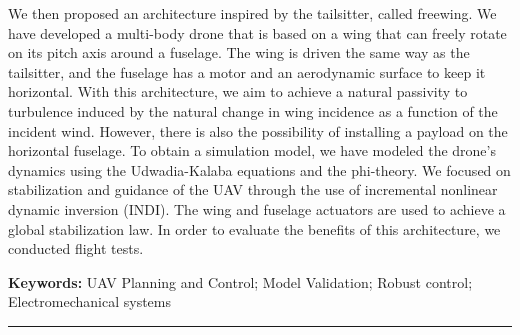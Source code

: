 \begin{vcenterpage}
We then proposed an architecture inspired by the tailsitter, called freewing. We have developed a multi-body drone that is based on a wing that can freely rotate on its pitch axis around a fuselage. The wing is driven the same way as the tailsitter, and the fuselage has a motor and an aerodynamic surface to keep it horizontal. With this architecture, we aim to achieve a natural passivity to turbulence induced by the natural change in wing incidence as a function of the incident wind. However, there is also the possibility of installing a payload on the horizontal fuselage. To obtain a simulation model, we have modeled the drone's dynamics using the Udwadia-Kalaba equations and the phi-theory. We focused on stabilization and guidance of the UAV through the use of incremental nonlinear dynamic inversion (INDI). The wing and fuselage actuators are used to achieve a global stabilization law. In order to evaluate the benefits of this architecture, we conducted flight tests.

{\large\textbf{Keywords:}}
UAV Planning and Control; Model Validation; Robust control; Electromechanical systems

\noindent\rule[2pt]{\textwidth}{0.5pt}
\end{vcenterpage}
